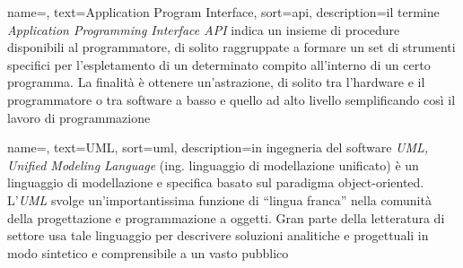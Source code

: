 
\renewcommand{\acronymname}{Acronimi e abbreviazioni}









{
    name=,
    text=Application Program Interface,
    sort=api,
    description={il termine \emph{Application Programming Interface API} indica un insieme di procedure disponibili al programmatore, di solito raggruppate a formare un set di strumenti specifici per l'espletamento di un determinato compito all'interno di un certo programma. La finalità è ottenere un'astrazione, di solito tra l'hardware e il programmatore o tra software a basso e quello ad alto livello semplificando così il lavoro di programmazione}
}

{
    name=,
    text=UML,
    sort=uml,
    description={in ingegneria del software \emph{UML, Unified Modeling Language} (ing. linguaggio di modellazione unificato) è un linguaggio di modellazione e specifica basato sul paradigma object-oriented. L'\emph{UML} svolge un'importantissima funzione di ``lingua franca'' nella comunità della progettazione e programmazione a oggetti. Gran parte della letteratura di settore usa tale linguaggio per descrivere soluzioni analitiche e progettuali in modo sintetico e comprensibile a un vasto pubblico}
}

